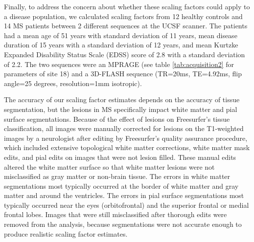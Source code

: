 Finally, to address the concern about whether these scaling factors could apply to a disease population, we calculated scaling factors from 12 healthy controls and 14 MS patients between 2 different sequences at the UCSF scanner. The patients had a mean age of 51 years with standard deviation of 11 years, mean disease duration of 15 years with a standard deviation of 12 years, and mean Kurtzke Expanded Disability Status Scale (EDSS) \cite{Kurtzke_1983} score of 2.8 with a standard deviation of 2.2. The two sequences were an MPRAGE (see table \ref{tab:acquisition2} for parameters of site 18) and a 3D-FLASH sequence (TR=20ms, TE=4.92ms, flip angle=25 degrees, resolution=1mm isotropic). 

The accuracy of our scaling factor estimates depends on the accuracy of tissue segmentation, but the lesions in MS specifically impact white matter and pial surface segmentations. Because of the effect of lesions on Freesurfer's tissue classification, all images were manually corrected for lesions on the T1-weighted images by a neurologist after editing by Freesurfer's quality assurance procedure, which included extensive topological white matter corrections, white matter mask edits, and pial edits on images that were not lesion filled.  These manual edits altered the white matter surface so that white matter lesions were not misclassified as gray matter or non-brain tissue. The errors in white matter segmentations most typically occurred at the border of white matter and gray matter and around the ventricles. The errors in pial surface segmentations most typically occurred near the eyes (orbitofrontal) and the superior frontal or medial frontal lobes. Images that were still misclassified after thorough edits were removed from the analysis, because segmentations were not accurate enough to produce realistic scaling factor estimates.